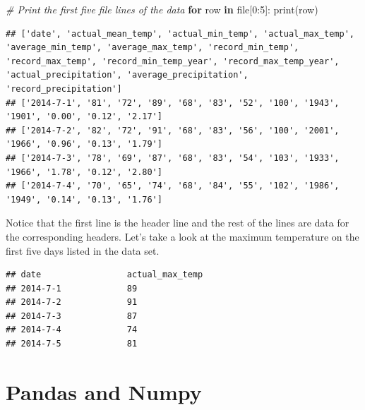 \documentclass[]{book}
\newenvironment{Shaded}{\begin{snugshade}}{\end{snugshade}}
\newcommand{\KeywordTok}[1]{\textcolor[rgb]{0.13,0.29,0.53}{\textbf{#1}}}
\newcommand{\DecValTok}[1]{\textcolor[rgb]{0.00,0.00,0.81}{#1}}
\newcommand{\SpecialCharTok}[1]{\textcolor[rgb]{0.00,0.00,0.00}{#1}}
\newcommand{\StringTok}[1]{\textcolor[rgb]{0.31,0.60,0.02}{#1}}
\newcommand{\CommentTok}[1]{\textcolor[rgb]{0.56,0.35,0.01}{\textit{#1}}}
\newcommand{\ControlFlowTok}[1]{\textcolor[rgb]{0.13,0.29,0.53}{\textbf{#1}}}
\newcommand{\OperatorTok}[1]{\textcolor[rgb]{0.81,0.36,0.00}{\textbf{#1}}}
\newcommand{\BuiltInTok}[1]{#1}
\newcommand{\NormalTok}[1]{#1}
\begin{document}
\begin{Shaded}
\begin{Highlighting}[]
\CommentTok{# Print the first five file lines of the data }
\ControlFlowTok{for}\NormalTok{ row }\KeywordTok{in} \BuiltInTok{file}\NormalTok{[}\DecValTok{0}\NormalTok{:}\DecValTok{5}\NormalTok{]: }
  \BuiltInTok{print}\NormalTok{(row)}
\end{Highlighting}
\end{Shaded}

\begin{verbatim}
## ['date', 'actual_mean_temp', 'actual_min_temp', 'actual_max_temp', 'average_min_temp', 'average_max_temp', 'record_min_temp', 'record_max_temp', 'record_min_temp_year', 'record_max_temp_year', 'actual_precipitation', 'average_precipitation', 'record_precipitation']
## ['2014-7-1', '81', '72', '89', '68', '83', '52', '100', '1943', '1901', '0.00', '0.12', '2.17']
## ['2014-7-2', '82', '72', '91', '68', '83', '56', '100', '2001', '1966', '0.96', '0.13', '1.79']
## ['2014-7-3', '78', '69', '87', '68', '83', '54', '103', '1933', '1966', '1.78', '0.12', '2.80']
## ['2014-7-4', '70', '65', '74', '68', '84', '55', '102', '1986', '1949', '0.14', '0.13', '1.76']
\end{verbatim}

Notice that the first line is the header line and the rest of the lines
are data for the corresponding headers. Let's take a look at the maximum
temperature on the first five days listed in the data set.

\begin{Shaded}
\end{Shaded}

\begin{verbatim}
## date                 actual_max_temp
## 2014-7-1             89
## 2014-7-2             91
## 2014-7-3             87
## 2014-7-4             74
## 2014-7-5             81
\end{verbatim}

\section{Pandas and Numpy}\label{pandas-and-numpy}
\end{document}
